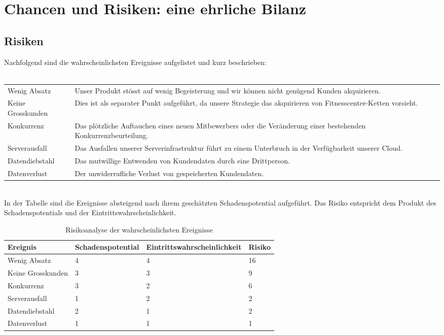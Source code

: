 \section{Chancen und Risiken: eine ehrliche Bilanz}

\subsection{Risiken}
Nachfolgend sind die wahrscheinlichsten Ereignisse aufgelistet und kurz beschrieben:
\\ \\
\begin{tabu} to \linewidth {l X}
	Wenig Absatz & Unser Produkt stösst auf wenig Begeisterung und wir können nicht genügend Kunden akquirieren. \newline \\
	Keine Grosskunden & Dies ist als separater Punkt aufgeführt, da unsere Strategie das akquirieren von Fitnesscenter-Ketten vorsieht. \newline \\
	Konkurrenz & Das plötzliche Auftauchen eines neuen Mitbewerbers oder die Veränderung einer bestehenden Konkurrenzbeurteilung. \newline \\
	Serverausfall & Das Ausfallen unserer Serverinfrastruktur führt zu einem Unterbruch in der Verfügbarkeit unserer Cloud. \newline \\
	Datendiebstahl & Das mutwillige Entwenden von Kundendaten durch eine Drittperson. \newline \\
	Datenverlust & Der unwiderrufliche Verlust von gespeicherten Kundendaten. \newline \\
\end{tabu}

\hfill \\
In der Tabelle sind die Ereignisse absteigend nach ihrem geschätzten Schadenspotential aufgeführt. Das Risiko entspricht dem Produkt des Schadenspotentials und der Eintrittswahrscheinlichkeit.
\begin{table}[h]
	\centering
	\begin{tabu} to \linewidth {l l l l}
		\toprule
		Ereignis & Schadenspotential & Eintrittswahrscheinlichkeit & Risiko \\
		\midrule
		Wenig Absatz & 4 & 4 & 16 \\
		Keine Grosskunden & 3 & 3 & 9 \\
		Konkurrenz & 3 & 2 & 6 \\
		Serverausfall & 1 & 2 & 2 \\
		Datendiebstahl & 2 & 1 & 2 \\
		Datenverlust & 1 & 1 & 1 \\
		\bottomrule
	\end{tabu}
	\label{tbl:risikoanalyse}
	\caption{Risikoanalyse der wahrscheinlichsten Ereignisse}
\end{table}

